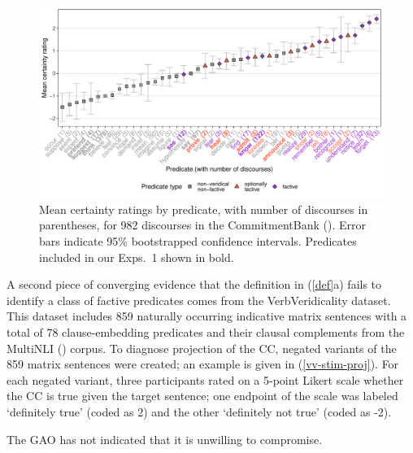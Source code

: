 \documentclass[11pt,fleqn]{article}
\newcommand{\6}{\mbox{$[\hspace*{-.6mm}[$}}
\newcommand{\9}{\mbox{$]\hspace*{-.6mm}]$}}
\begin{document}
\begin{figure}[H]
\centering
\includegraphics[width=.75\paperwidth]{../../CommitmentBank-analysis/graphs/means-projectivity-by-predicate-variability}

\caption{Mean certainty ratings by predicate, with number of discourses in parentheses, for 982 discourses in the CommitmentBank (\citealt*{demarneffe-etal-sub23}). Error bars indicate 95\% bootstrapped confidence intervals. Predicates included in our Exps.~1 shown in bold.}
\label{f-commitmentbank}
\end{figure}

A second piece of converging evidence that the definition in (\ref{def}a) fails to identify a class of factive predicates comes from the VerbVeridicality dataset. This dataset includes 859 naturally occurring indicative matrix sentences with a total of 78 clause-embedding predicates and their clausal complements from the MultiNLI (\citealt{williams-etal2018}) corpus. To diagnose projection of the CC, negated variants of the 859 matrix sentences were created; an example is given in (\ref{vv-stim-proj}). For each negated variant, three participants rated on a 5-point Likert scale whether the CC is true given the target sentence; one endpoint of the scale was labeled `definitely true' (coded as 2) and the other `definitely not true' (coded as -2).

\begin{exe}
\ex\label{vv-stim-proj} The GAO has not indicated that it is unwilling to compromise.
\end{exe}
\end{document}
